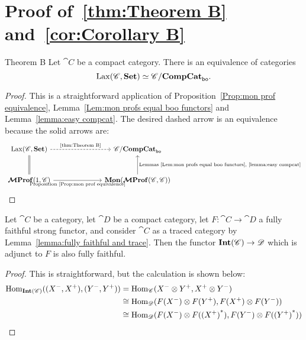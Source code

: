 \documentclass[12pt,oneside,article,draft]{memoir}
\begin{document}
\section{Proof of~\ref{thm:Theorem B} and~\ref{cor:Corollary B}}\label{sec:proof of Bs}

\begin{named}{Theorem B}\label{thm:Theorem B}
   Let $\cat{C}$ be a compact category.
   There is an equivalence of categories
   \[
      \operatorname{Lax}(\mathscr{C},\mathbf{Set})\simeq\mathscr{C}/\mathbf{CompCat}_{\mathsf{bo}}.
   \]
\end{named}
\begin{proof}
   This is a straightforward application of Proposition~\ref{Prop:mon prof equivalence}, Lemma~\ref{Lem:mon profs equal boo functors} and Lemma~\ref{lemma:easy compcat}.
   The desired dashed arrow is an equivalence because the solid arrows are:
   $$
   \begin{tikzcd}[column sep=2.5cm,row sep=1cm]
      \Lax(\cat{C},\Set)\ar[d,equal]\ar[r,dashed,"\tn{\ref{thm:Theorem B}}"]
         &\cat{C}/\CompCat_{\bo} \\
      \MProf(1,\cat{C})\ar[r,"\tn{Proposition~\ref{Prop:mon prof equivalence}}"']
         &\Mon(\MProf(\cat{C},\cat{C}))\ar[u,"\tn{Lemmas~\ref{Lem:mon profs equal boo functors},~\ref{lemma:easy compcat}}"']
   \end{tikzcd}
   $$
\end{proof}

\begin{lemma}\label{lemma:more fully faithfulness}
   Let $\cat{C}$ be a category, let $\cat{D}$ be a compact category, let $F\colon\cat{C}\to\cat{D}$ a fully faithful strong functor, and consider $\cat{C}$ as a traced category by Lemma~\ref{lemma:fully faithful and trace}.
   Then the functor $\mathbf{Int}(\mathscr{C})\to\mathscr{D}$ which is adjunct to $F$ is also fully faithful.
\end{lemma}
\begin{proof}
   This is straightforward, but the calculation is shown below:
   \begin{align*}
      \operatorname{Hom}_{\mathbf{Int}(\mathscr{C})}((X^-,X^+),(Y^-,Y^+))&=\operatorname{Hom}_{\mathscr{C}}(X^-\otimes Y^+,X^+\otimes Y^-) \\
      &\cong\operatorname{Hom}_{\mathscr{D}}(F(X^-)\otimes F(Y^+),F(X^+)\otimes F(Y^-)) \\
      &\cong\operatorname{Hom}_{\mathscr{D}}(F(X^-)\otimes F({(X^+)}^*),F(Y^-)\otimes F({(Y^+)}^*))
   \end{align*}
\end{proof}
\end{document}
